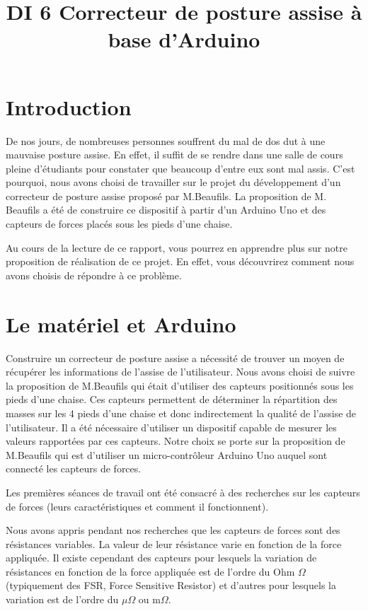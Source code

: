 \documentclass{polytech/polytech}
\title{DI 6 Correcteur de posture assise à base d'Arduino}
\begin{document}
\chapter*{Introduction}

De nos jours, de nombreuses personnes souffrent du mal de dos dut à une mauvaise posture assise. En effet, il suffit de se rendre dans une salle de cours pleine d'étudiants pour constater que beaucoup d'entre eux sont mal assis. C'est pourquoi, nous avons choisi de travailler sur le projet du développement d'un correcteur de posture assise proposé par M.Beaufils. La proposition de M. Beaufils a été de construire ce dispositif à partir d'un Arduino Uno et des capteurs de forces placés sous les pieds d'une chaise. 

Au cours de la lecture de ce rapport, vous pourrez en apprendre plus sur notre proposition de réalisation de ce projet. En effet, vous découvrirez comment nous avons choisis de répondre à ce problème.

\chapter{Le matériel et Arduino}
\label{chap:arduino}

Construire un correcteur de posture assise a nécessité de trouver un moyen de récupérer les informations de l'assise de l'utilisateur. Nous avons choisi de suivre la proposition de M.Beaufils qui était d'utiliser des capteurs positionnés sous les pieds d'une chaise. Ces capteurs permettent de déterminer la répartition des masses sur les 4 pieds d'une chaise et donc indirectement la qualité de l'assise de l'utilisateur. Il a été nécessaire d'utiliser un dispositif capable de mesurer les valeurs rapportées par ces capteurs. Notre choix se porte sur la proposition de M.Beaufils qui est d'utiliser un  micro-contrôleur Arduino Uno auquel sont connecté les capteurs de forces. 

Les premières séances de travail ont été consacré à des recherches sur les capteurs de forces (leurs caractéristiques et comment il fonctionnent). 

Nous avons appris pendant nos recherches que les capteurs de forces sont des résistances variables. La valeur de leur résistance varie en fonction de la force appliquée. Il existe cependant des capteurs pour lesquels la variation de résistances en fonction de la force appliquée est de l'ordre du Ohm $\Omega$ (typiquement des FSR, Force Sensitive Resistor) et d'autres pour lesquels la variation est de l'ordre du $\mu \Omega$ ou $\mathrm{m} \Omega$.
\end{document}
